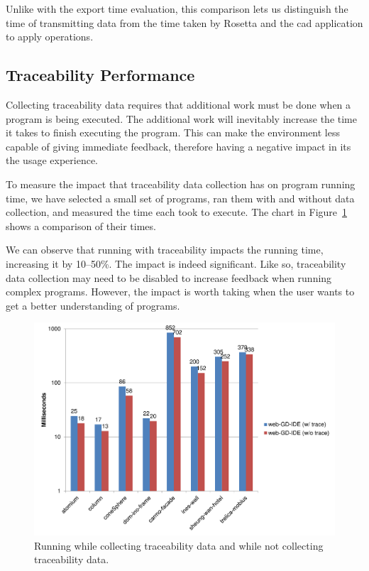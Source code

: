 Unlike with the export time evaluation, this comparison lets us distinguish the time of transmitting data from the time taken by Rosetta and the \gls{cad} application to apply operations.


\subsection{Traceability Performance}
Collecting traceability data requires that additional work must be done when a program is being executed.
The additional work will inevitably increase the time it takes to finish executing the program.
This can make the environment less capable of giving immediate feedback, therefore having a negative impact in its the usage experience.

To measure the impact that traceability data collection has on program running time, we have selected a small set of programs, ran them with and without data collection, and measured the time each took to execute.
The chart in Figure~\ref{fig:traceability:timing} shows a comparison of their times.

We can observe that running with traceability impacts the running time, increasing it by 10--50\%.
The impact is indeed significant.
Like so, traceability data collection may need to be disabled to increase feedback when running complex programs.
However, the impact is worth taking when the user wants to get a better understanding of programs.

\begin{figure}
  \centering
  \includegraphics[width=1.0\textwidth]{./images/traceability_timing}
  \caption{Running while collecting traceability data and while not collecting traceability data.}
  \label{fig:traceability:timing}
\end{figure}




